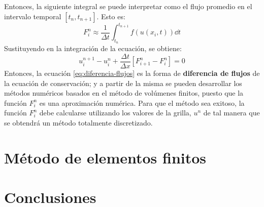 \documentclass[12pt]{article}
\begin{document}
	Entonces, la siguiente integral se puede interpretar como el flujo promedio en el intervalo temporal $[t_n,t_{n+1}]$. Esto es:
	\begin{equation}
		F_{i}^{n} \approx \frac{1}{\Delta t} \int_{t_n}^{t_{n+1}} f(u(x_i,t)) \dd{t}
		\label{eq:flujo_promedio}
	\end{equation}
	Sustituyendo en la integración de la ecuación, se obtiene:
	\begin{equation}
		u_{i}^{n+1} - u_{i}^{n} + \frac{\Delta t}{\Delta x}\left[ F_{i+1}^n - F_{i}^{n}\right] = 0
		\label{eq:diferencia-flujos}
	\end{equation}
	Entonces, la ecuación \ref{eq:diferencia-flujos} es la forma de \textbf{diferencia de flujos} de la ecuación de conservación; y a partir de la misma se pueden desarrollar los métodos numéricos basados en el método de volúmenes finitos, puesto que la función $F_{i}^{n}$ es una aproximación numérica. Para que el método sea exitoso, la función $F_{i}^{n}$ debe calcularse utilizando los valores de la grilla, $u^{n}$ de tal manera que se obtendrá un método totalmente discretizado. \cite{LeVeque1998}
	\section{Método de elementos finitos}
	\section{Conclusiones}
	
	\printbibliography
	
\end{document}
